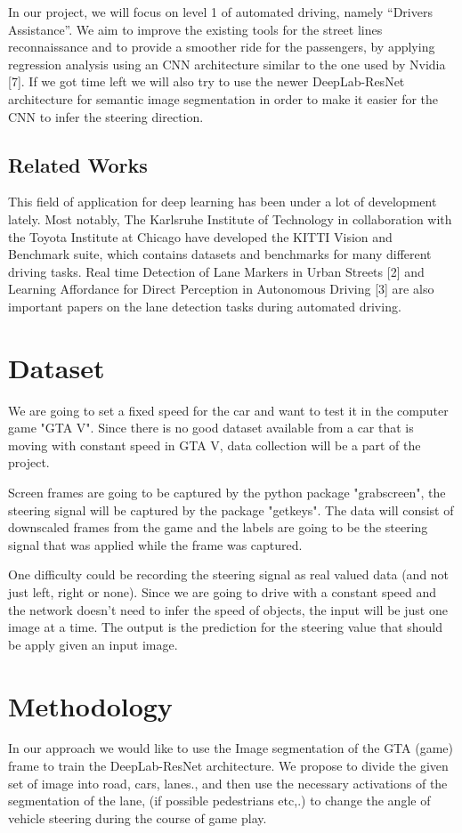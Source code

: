 \documentclass[10pt,twocolumn,letterpaper]{article}
\begin{document}
	In our project, we will focus on level 1 of automated driving, namely “Drivers Assistance”. We aim to improve the existing tools for the street lines reconnaissance and to provide a smoother ride for the passengers, by applying regression analysis using an CNN architecture similar to the one used by Nvidia [7].  If we got time left we will also try to use the newer DeepLab-ResNet architecture for semantic image segmentation in order to make it easier for the CNN to infer the steering direction. 
	
	\subsection{Related Works}
	
	This field of application for deep learning has been under a lot of development lately. Most notably, The Karlsruhe Institute of Technology in collaboration with the Toyota Institute at Chicago have developed the KITTI Vision and Benchmark suite, which contains datasets and benchmarks for many different driving tasks. Real time Detection of Lane Markers in Urban Streets [2] and Learning Affordance for Direct Perception in Autonomous Driving [3] are also important papers on the lane detection tasks during automated driving.
	
	\section{Dataset}
	We are going to set a fixed speed for the car and want to test it in the computer game "GTA V". Since there is no good dataset available from a car that is moving with constant speed in GTA V, data collection will be a part of the project.  
	
	Screen frames are going to be captured by the python package "grabscreen", the steering signal will be captured by the package "getkeys". The data will consist of downscaled frames from the game and the labels are going to be the steering signal that was applied while the frame was captured.
	
	One difficulty could be recording the steering signal as real valued data (and not just left, right or none). Since we are going to drive with a constant speed and the network doesn't need to infer the speed of objects, the input will be just one image at a time. The output is the prediction for the steering value that should be apply given an input image.
	
	\section{Methodology}
	In our approach we would like to use the Image segmentation of the GTA (game) frame to train the DeepLab-ResNet architecture. We propose to divide the given set of image into road, cars, lanes., and then use the 
	necessary activations of the segmentation of the lane, (if possible pedestrians etc,.) to change the angle of vehicle steering during the course of game play.
	
\end{document}
